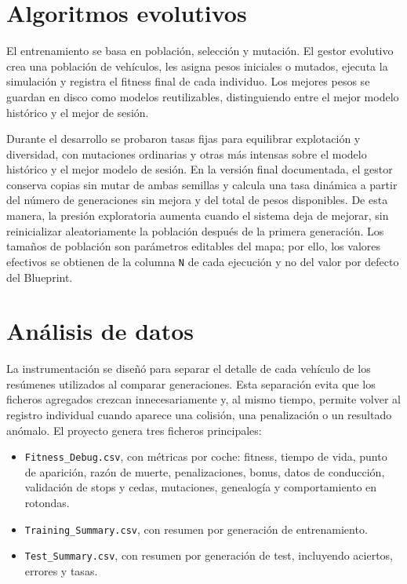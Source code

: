 \section{Algoritmos evolutivos}

El entrenamiento se basa en población, selección y mutación. El gestor evolutivo crea una población de vehículos, les asigna pesos iniciales o mutados, ejecuta la simulación y registra el fitness final de cada individuo. Los mejores pesos se guardan en disco como modelos reutilizables, distinguiendo entre el mejor modelo histórico y el mejor de sesión.

Durante el desarrollo se probaron tasas fijas para equilibrar explotación y diversidad, con mutaciones ordinarias y otras más intensas sobre el modelo histórico y el mejor modelo de sesión. En la versión final documentada, el gestor conserva copias sin mutar de ambas semillas y calcula una tasa dinámica a partir del número de generaciones sin mejora y del total de pesos disponibles. De esta manera, la presión exploratoria aumenta cuando el sistema deja de mejorar, sin reinicializar aleatoriamente la población después de la primera generación. Los tamaños de población son parámetros editables del mapa; por ello, los valores efectivos se obtienen de la columna \texttt{N} de cada ejecución y no del valor por defecto del Blueprint.

\section{Análisis de datos}

La instrumentación se diseñó para separar el detalle de cada vehículo de los resúmenes utilizados al comparar generaciones. Esta separación evita que los ficheros agregados crezcan innecesariamente y, al mismo tiempo, permite volver al registro individual cuando aparece una colisión, una penalización o un resultado anómalo. El proyecto genera tres ficheros principales:

\begin{itemize}[leftmargin=*]
  \item \texttt{Fitness\_Debug.csv}, con métricas por coche: fitness, tiempo de vida, punto de aparición, razón de muerte, penalizaciones, bonus, datos de conducción, validación de stops y cedas, mutaciones, genealogía y comportamiento en rotondas.
  \item \texttt{Training\_Summary.csv}, con resumen por generación de entrenamiento.
  \item \texttt{Test\_Summary.csv}, con resumen por generación de test, incluyendo aciertos, errores y tasas.
\end{itemize}

